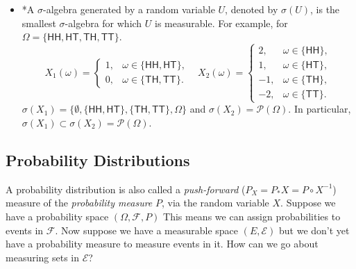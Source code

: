 \documentclass{tufte-handout}
\begin{document}
\begin{itemize}
\item *A $\sigma$-algebra generated by a random variable $U$, denoted by $\sigma(U)$, is the smallest $\sigma$-algebra for which $U$ is measurable.
For example, for $\Omega=\{\mathsf{HH,HT,TH,TT}\}$.
\begin{equation*}
X_1(\omega) = 
\begin{cases}
 1, & \omega \in \mathsf{\{HH,HT\}},\\
 0, & \omega \in \mathsf{\{TH,TT\}}.
\end{cases}\,\,\,\,\,
X_2(\omega) = 
\begin{cases}
 2, & \omega \in \mathsf{\{HH\}},\\
 1, & \omega \in \mathsf{\{HT\}},\\
 -1, & \omega \in \mathsf{\{TH\}},\\
 -2, & \omega \in \mathsf{\{TT\}}. 
\end{cases}				
\end{equation*}
 $\sigma(X_1)=\{\emptyset, \mathsf{\{HH,HT\},\{TH,TT\}}, \Omega\}$ and $\sigma(X_2)=\mathscr P(\Omega)$. In particular,
$\sigma(X_1)\subset \sigma(X_2)=\mathscr P(\Omega)$.

\end{itemize}



\subsection{Probability Distributions}


A probability distribution is also called a \textit{push-forward} ($P_X = P_* X = P \circ X^{-1}$) measure of the \textit{probability measure} $P$,
 via the random variable $X$. Suppose we have a probability space $(\Omega, \mathcal F, P)$
This means we can assign probabilities to events in $\mathcal F$. Now suppose we have a measurable space 
 $(E, \mathcal E)$ but we don’t yet have a probability measure to measure events in it. How can we go about measuring sets in 
 $\mathcal E$?
\end{document}
